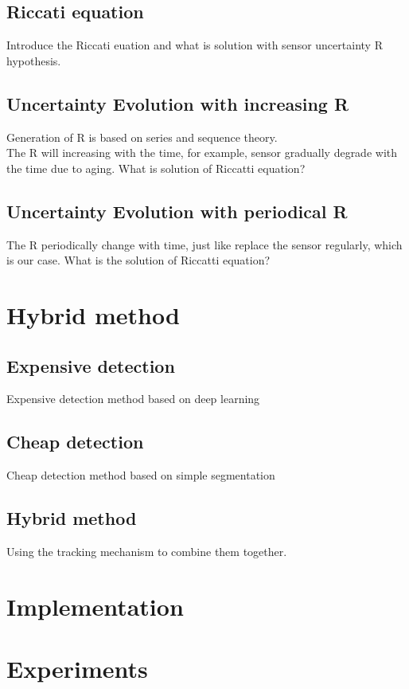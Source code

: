\documentclass[12pt]{article}
\begin{document}
\subsection{Riccati equation}\label{Riccati_equation}
Introduce the Riccati euation and what is solution with sensor uncertainty R hypothesis.

\subsection{Uncertainty Evolution with increasing R}
Generation of R is based on series and sequence theory.\\
The R will increasing with the time, for example, sensor gradually degrade with the time due to aging. What is solution of Riccatti equation?

\subsection{Uncertainty Evolution with periodical R}
The R periodically change with time, just like replace the sensor regularly, which is our case. What is the solution of Riccatti equation?


\section{Hybrid method}\label{hybrid_method}

\subsection{Expensive detection}
Expensive detection method based on deep learning\cite{voxelnet}

\subsection{Cheap detection}
Cheap detection method based on simple segmentation

\subsection{Hybrid method}
Using the tracking mechanism to combine them together.

\section{Implementation}\label{Implementation}


\section{Experiments}\label{experiments}
 
 
 



\end{document}

